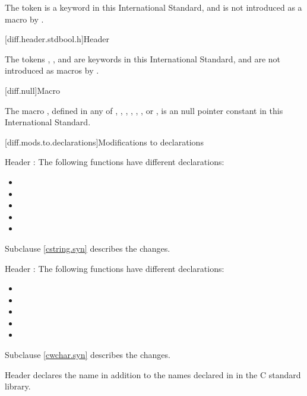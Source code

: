 \pnum
The token  is a keyword in this International
Standard,
and is not introduced as a macro
by .

[diff.header.stdbool.h]{Header }
%

\pnum
The tokens , , and 
are keywords in this International Standard,
and are not introduced as macros
by .

[diff.null]{Macro }

\pnum
The macro
,
defined in any of
,
,
,
,
,
,
or ,
is an  \Cpp{} null pointer constant in
this International Standard.

[diff.mods.to.declarations]{Modifications to declarations}

\pnum
Header :
The following functions have different declarations:

\begin{itemize}
\item {}
\item {}
\item {}
\item {}
\item {}
\end{itemize}

Subclause \ref{cstring.syn} describes the changes.

\pnum
Header :
The following functions have different declarations:

\begin{itemize}
\item {}
\item {}
\item {}
\item {}
\item {}
\end{itemize}

Subclause \ref{cwchar.syn} describes the changes.

\pnum
Header 
declares the name  in addition to the names declared in
 in the C standard library.

